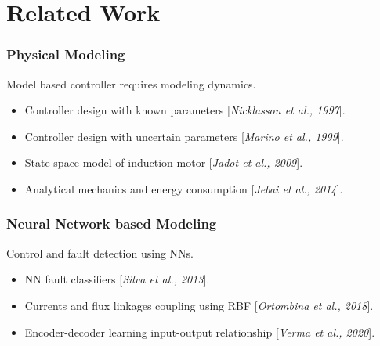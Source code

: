 \documentclass{beamer}
\newcommand{\etal}{\textit{et al.}}
\begin{document}






\section{Related Work}

\begin{frame}
\frametitle{Physical Modeling}

Model based controller requires modeling dynamics.
\begin{itemize}
    \item Controller design with known parameters [\textit{Nicklasson \etal, 1997}].
    \item Controller design with uncertain parameters [\textit{Marino \etal, 1999}].
    \item State-space model of induction motor [\textit{Jadot \etal, 2009}].
    \item Analytical mechanics and energy consumption [\textit{Jebai \etal, 2014}].
\end{itemize}

\end{frame}

\begin{frame}
\frametitle{Neural Network based Modeling}

Control and fault detection using NNs.
\begin{itemize}
    \item NN fault classifiers [\textit{Silva \etal, 2013}].
    \item Currents and flux linkages coupling using RBF [\textit{Ortombina \etal, 2018}].
    \item Encoder-decoder learning input-output relationship [\textit{Verma \etal, 2020}].
\end{itemize}

\end{frame}
\end{document}
